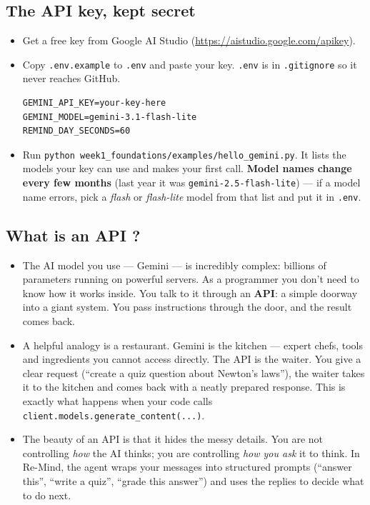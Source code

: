 \subsection{The API key, kept secret}
\begin{itemize}
  \item Get a free key from Google AI Studio (\url{https://aistudio.google.com/apikey}).
  \item Copy \texttt{.env.example} to \texttt{.env} and paste your key. \texttt{.env} is in \texttt{.gitignore} so it
        never reaches GitHub.
\begin{lstlisting}[style=shell]
GEMINI_API_KEY=your-key-here
GEMINI_MODEL=gemini-3.1-flash-lite
REMIND_DAY_SECONDS=60
\end{lstlisting}
  \item Run \texttt{python week1\_foundations/examples/hello\_gemini.py}. It lists the models your key can use and
        makes your first call. \textbf{Model names change every few months} (last year it was
        \texttt{gemini-2.5-flash-lite}) --- if a model name errors, pick a \emph{flash} or \emph{flash-lite} model from
        that list and put it in \texttt{.env}.
\end{itemize}


\subsection{What is an API ?}
\begin{itemize}
  \item The AI model you use --- Gemini --- is incredibly complex: billions of parameters running on powerful servers.
        As a programmer you don't need to know how it works inside. You talk to it through an \textbf{API}: a simple
        doorway into a giant system. You pass instructions through the door, and the result comes back.
  \item A helpful analogy is a restaurant. Gemini is the kitchen --- expert chefs, tools and ingredients you
        cannot access directly. The API is the waiter. You give a clear request (``create a quiz question about
        Newton's laws''), the waiter takes it to the kitchen and comes back with a neatly prepared response.
        This is exactly what happens when your code calls \texttt{client.models.generate\_content(...)}.
  \item The beauty of an API is that it hides the messy details. You are not controlling \emph{how} the AI thinks;
        you are controlling \emph{how you ask} it to think. In Re-Mind, the agent wraps your messages into
        structured prompts (``answer this'', ``write a quiz'', ``grade this answer'') and uses the replies to decide
        what to do next.
\end{itemize}

